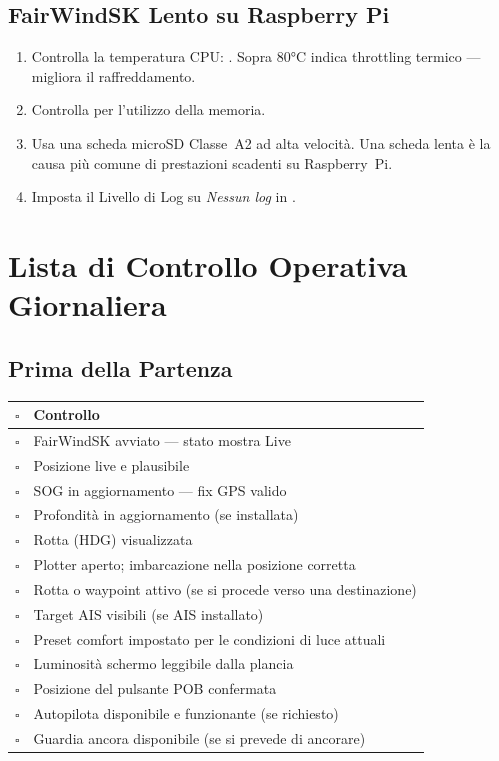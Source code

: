\section{FairWindSK Lento su Raspberry Pi}

\begin{enumerate}
  \item Controlla la temperatura CPU: .
        Sopra 80°C indica throttling termico --- migliora il raffreddamento.
  \item Controlla  per l'utilizzo della memoria.
  \item Usa una scheda microSD Classe~A2 ad alta velocità.
        Una scheda lenta è la causa più comune di prestazioni scadenti su Raspberry~Pi.
  \item Imposta il Livello di Log su \textit{Nessun log} in
        .
\end{enumerate}

\chapter{Lista di Controllo Operativa Giornaliera}
\label{ch:checklist}

\section*{Prima della Partenza}

\begin{longtable}{C{0.8cm}L{12.9cm}}
\toprule
{}
\color{white}\sffamily\bfseries $\square$ &
\color{white}\sffamily\bfseries Controllo \\
\midrule
$\square$ & FairWindSK avviato --- stato mostra Live \\
$\square$ & Posizione live e plausibile \\
$\square$ & SOG in aggiornamento --- fix GPS valido \\
$\square$ & Profondità in aggiornamento (se installata) \\
$\square$ & Rotta (HDG) visualizzata \\
$\square$ & Plotter aperto; imbarcazione nella posizione corretta \\
$\square$ & Rotta o waypoint attivo (se si procede verso una destinazione) \\
$\square$ & Target AIS visibili (se AIS installato) \\
$\square$ & Preset comfort impostato per le condizioni di luce attuali \\
$\square$ & Luminosità schermo leggibile dalla plancia \\
$\square$ & Posizione del pulsante POB confermata \\
$\square$ & Autopilota disponibile e funzionante (se richiesto) \\
$\square$ & Guardia ancora disponibile (se si prevede di ancorare) \\
\bottomrule
\end{longtable}


